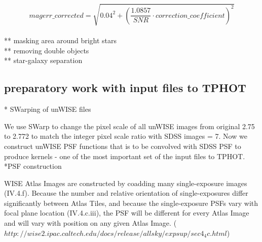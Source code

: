 \documentclass[numberedappendix,apj,twocolumn]{emulateapj}
\begin{document}
$$ magerr\_corrected = \sqrt{0.04^{2}+(\dfrac{1.0857}{SNR}\cdot correction\_coefficient)^{2}}$$
\\
** masking area around bright stars\\
** removing double objects\\
** star-galaxy separation

\subsection{preparatory work with input files to TPHOT} 
	* SWarping of unWISE files
	
We use SWarp to change the pixel scale of all unWISE images from original 2.75 to 2.772 to match the integer pixel scale ratio with SDSS images = 7. Now we construct unWISE PSF functions that is to be convolved with SDSS PSF to produce kernels - one of the most important set of the input files to TPHOT.	
*PSF construction

WISE Atlas Images are constructed by coadding many single-exposure images (IV.4.f). Because the number and relative orientation of single-exposures differ significantly between Atlas Tiles, and because the single-exposure PSFs vary with focal plane location (IV.4.c.iii), the PSF will be different for every Atlas Image and will vary with position on any given Atlas Image. ($http://wise2.ipac.caltech.edu/docs/release/allsky/expsup/sec4_4c.html$)
\end{document}
